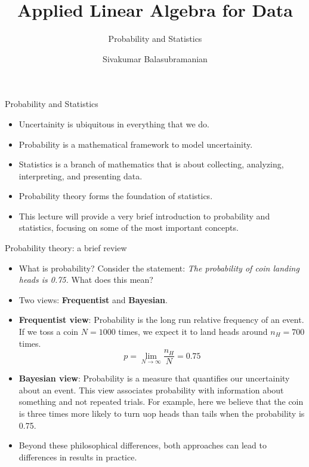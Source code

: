 \documentclass[aspectratio=169]{beamer}
\title{Applied Linear Algebra for Data}
\subtitle{Probability and Statistics}
\author{Sivakumar Balasubramanian}
\institute[Christian Medical College] %
{
  \inst{}%
  Department of Bioengineering\\
  Christian Medical College, Bagayam\\
  Vellore 632002
}
\date{}
\let\olditem\item
\renewcommand{\item}{\setlength{\itemsep}{\fill}\olditem}
\begin{document}


\begin{frame}
  \titlepage
\end{frame}



\begin{frame}[t]{Probability and Statistics}
\begin{itemize}
    \item Uncertainity is ubiquitous in everything that we do.
    
    \item Probability is a mathematical framework to model uncertainity.  

    \item Statistics is a branch of mathematics that is about collecting, analyzing, interpreting, and presenting data.
    
    \item Probability theory forms the foundation of statistics.
    
    \item This lecture will provide a very brief introduction to probability and statistics, focusing on some of the most important concepts.
\end{itemize}
\end{frame}


\begin{frame}[t]{Probability theory: a brief review}
\begin{itemize}
    \item What is probability? Consider the statement: \textit{The probability of coin landing heads is 0.75.} What does this mean?
    
    \item Two views: \textbf{Frequentist} and \textbf{Bayesian}.
    
    \item \textbf{Frequentist view}: Probability is the long run relative frequency of an event. If we 
    toss a coin $N=1000$ times, we expect it to land heads around $n_H = 700$ times.
    \[ p = \lim_{N\to\infty} \frac{n_H}{N} = 0.75 \]
    
    \item \textbf{Bayesian view}: Probability is a measure that quantifies our uncertainity about an event. This view associates probability with information about something and not repeated trials. For example, here we believe that the coin is three times more likely to turn uop heads than tails when the probability is 0.75.
    
    \item Beyond these philosophical differences, both approaches can lead to differences in results in practice.
\end{itemize}
\end{frame}
\end{document}
